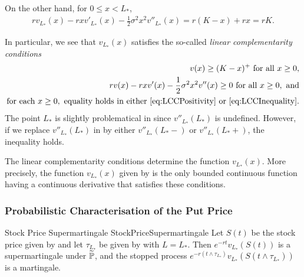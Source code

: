 On the other hand, for \(0 \le x < L_*\),
\begin{align} \label{eq:OperatorCheckWaitRegion}
	rv_{L_*}(x) - rxv'_{L_*}(x) - \frac{1}{2}\sigma^2 x^2 v''_{L_*}(x) = r(K - x) + rx = rK.
\end{align}

In particular, we see that \(v_{L_*}(x)\) satisfies the so-called \textit{linear complementarity conditions}
\begin{align}
	v(x) \ge (K - x)^+ \text{ for all } x \ge 0, \label{eq:LCCPositivity}                                                 \\
	rv(x) - rxv'(x) - \frac{1}{2}\sigma^2 x^2 v''(x) \ge 0 \text{ for all } x \ge 0, \text{ and} \label{eq:LCCInequality} \\
	\text{for each } x \ge 0, \text{ equality holds in either \Cref{eq:LCCPositivity} or \Cref{eq:LCCInequality}.} \label{eq:LCCSlackness}
\end{align}
The point \(L_*\) is slightly problematical in  since \(v''_{L_*}(L_*)\) is undefined. However, if we replace \(v''_{L_*}(L_*)\) in  by either \(v''_{L_*}(L_*-)\) or \(v''_{L_*}(L_*+)\), the inequality holds.

The linear complementarity conditions  determine the function \(v_{L_*}(x)\). More precisely, the function \(v_{L_*}(x)\) given by  is the only bounded continuous function having a continuous derivative that satisfies these conditions.

\subsubsection{Probabilistic Characterisation of the Put Price}

\begin{thm}{Stock Price Supermartingale }{StockPriceSupermartingale}
	Let \(S(t)\) be the stock price given by  and let \(\tau_{L_*}\) be given by  with \(L = L_*\). Then \(e^{-rt}v_{L_*}(S(t))\) is a supermartingale under \(\widetilde{\mathbb{P}}\), and the stopped process \(e^{-r(t \land \tau_{L_*})}v_{L_*}(S(t \land \tau_{L_*}))\) is a martingale.
\end{thm}

